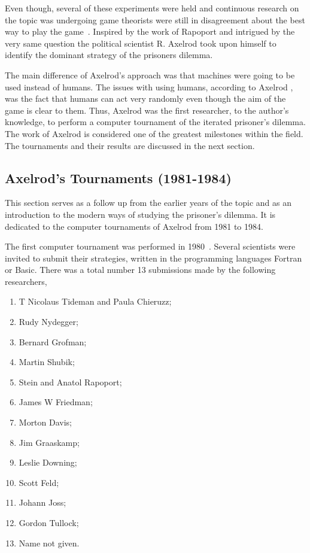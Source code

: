 \documentclass{article}
\begin{document}
Even though, several of these experiments were held and continuous research on
the topic was undergoing game theorists were still in disagreement about
the best way to play the game~\cite{rapoport1965}. Inspired by the work of
Rapoport and intrigued by the very same question the political scientist R. 
Axelrod took upon himself to identify the dominant strategy of the prisoners dilemma.
 
The main difference of Axelrod's approach was that machines were going to be used 
instead of humans. The issues with using humans, according to Axelrod
\cite{Axelrod2012}, was the fact that humans can act very randomly even though
the aim of the game is clear to them. Thus, Axelrod was the first researcher,
to the author's knowledge, to perform a computer tournament of the iterated
prisoner's dilemma. The work of Axelrod is considered one of the greatest
milestones within the field. The tournaments and their results are discussed in
the next section.

\subsection{Axelrod's Tournaments (1981-1984)}\label{subsection:axelrods_tournament}

This section serves as a follow up from the earlier years of the topic and as an
introduction to the modern ways of studying the prisoner's dilemma. It is 
dedicated to the computer tournaments of Axelrod from 1981 to 1984. 

The first computer tournament was performed in 1980~\cite{Axelrod1980a}.
Several scientists were invited to submit their strategies, written in the
programming languages Fortran or Basic. There was a total number 13 submissions
made by the following researchers,

\begin{multicols}{2}
    \begin{enumerate}
        \item T Nicolaus Tideman and Paula Chieruzz;
        \item Rudy Nydegger;
        \item Bernard Grofman;
        \item Martin Shubik;
        \item Stein and Anatol Rapoport;
        \item James W Friedman;
        \item Morton Davis;
        \item Jim Graaskamp;
        \item Leslie Downing;
        \item Scott Feld;
        \item Johann Joss;
        \item Gordon Tullock;
        \item Name not given.
    \end{enumerate}
\end{multicols}
\end{document}

